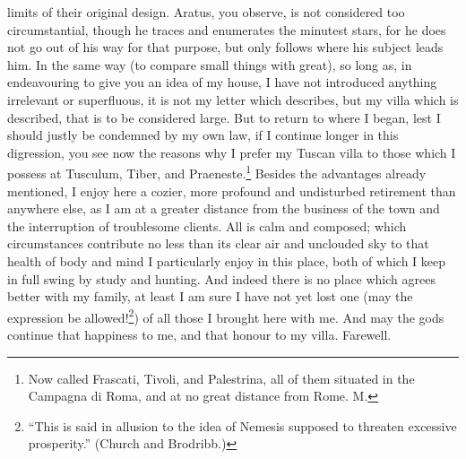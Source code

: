 limits of their original design. Aratus, you observe, is not considered
too circumstantial, though he traces and enumerates the minutest stars,
for he does not go out of his way for that purpose, but only follows where
his subject leads him. In the same way (to compare small things with
great), so long as, in endeavouring to give you an idea of my house, I
have not introduced anything irrelevant or superfluous, it is not my
letter which describes, but my villa which is described, that is to be
considered large. But to return to where I began, lest I should justly be
condemned by my own law, if I continue longer in this digression, you see
now the reasons why I prefer my Tuscan villa to those which I possess at
Tusculum, Tiber, and Praeneste.\footnote{Now called Frascati,
Tivoli, and Palestrina, all of them situated in the Campagna di Roma, and
at no great distance from Rome. M.} Besides the advantages already mentioned, I
enjoy here a cozier, more profound and undisturbed retirement than
anywhere else, as I am at a greater distance from the business of the town
and the interruption of troublesome clients. All is calm and composed;
which circumstances contribute no less than its clear air and unclouded
sky to that health of body and mind I particularly enjoy in this place,
both of which I keep in full swing by study and hunting. And indeed there
is no place which agrees better with my family, at least I am sure I have
not yet lost one (may the expression be allowed!\footnote{``This is said in allusion
to the idea of Nemesis supposed to threaten excessive prosperity.'' (Church
and Brodribb.)}) of all those I brought
here with me. And may the gods continue that happiness to me, and that
honour to my villa. Farewell.


